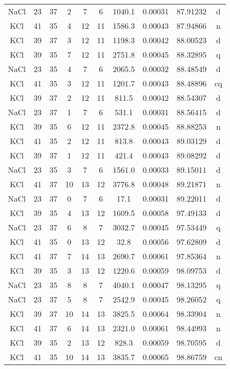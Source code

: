 \begin{table*}[htp]
\begin{tabular}{cccccccccc}
NaCl & 23 & 37 & 2 & 7 & 6 & 1040.1 & 0.00031 & 87.91232 & d \\
KCl & 41 & 35 & 4 & 12 & 11 & 1586.3 & 0.00043 & 87.94866 & n \\
KCl & 39 & 37 & 3 & 12 & 11 & 1198.3 & 0.00042 & 88.00523 & d \\
KCl & 39 & 35 & 7 & 12 & 11 & 2751.8 & 0.00045 & 88.32895 & q \\
NaCl & 23 & 35 & 4 & 7 & 6 & 2065.5 & 0.00032 & 88.48549 & d \\
KCl & 41 & 35 & 3 & 12 & 11 & 1201.7 & 0.00043 & 88.48896 & cq \\
KCl & 39 & 37 & 2 & 12 & 11 & 811.5 & 0.00042 & 88.54307 & d \\
NaCl & 23 & 37 & 1 & 7 & 6 & 531.1 & 0.00031 & 88.56415 & d \\
KCl & 39 & 35 & 6 & 12 & 11 & 2372.8 & 0.00045 & 88.88253 & n \\
KCl & 41 & 35 & 2 & 12 & 11 & 813.8 & 0.00043 & 89.03129 & d \\
KCl & 39 & 37 & 1 & 12 & 11 & 421.4 & 0.00043 & 89.08292 & d \\
NaCl & 23 & 35 & 3 & 7 & 6 & 1561.0 & 0.00033 & 89.15011 & d \\
KCl & 41 & 37 & 10 & 13 & 12 & 3776.8 & 0.00048 & 89.21871 & n \\
NaCl & 23 & 37 & 0 & 7 & 6 & 17.1 & 0.00031 & 89.22011 & d \\
KCl & 39 & 35 & 4 & 13 & 12 & 1609.5 & 0.00058 & 97.49133 & d \\
NaCl & 23 & 37 & 6 & 8 & 7 & 3032.7 & 0.00045 & 97.53449 & q \\
KCl & 41 & 35 & 0 & 13 & 12 & 32.8 & 0.00056 & 97.62809 & d \\
KCl & 41 & 37 & 7 & 14 & 13 & 2690.7 & 0.00061 & 97.85364 & n \\
KCl & 39 & 35 & 3 & 13 & 12 & 1220.6 & 0.00059 & 98.09753 & d \\
NaCl & 23 & 35 & 8 & 8 & 7 & 4040.1 & 0.00047 & 98.13295 & q \\
NaCl & 23 & 37 & 5 & 8 & 7 & 2542.9 & 0.00045 & 98.26052 & q \\
KCl & 39 & 37 & 10 & 14 & 13 & 3825.5 & 0.00064 & 98.33904 & n \\
KCl & 41 & 37 & 6 & 14 & 13 & 2321.0 & 0.00061 & 98.44993 & n \\
KCl & 39 & 35 & 2 & 13 & 12 & 828.3 & 0.00059 & 98.70595 & d \\
KCl & 41 & 35 & 10 & 14 & 13 & 3835.7 & 0.00065 & 98.86759 & cn \\

\end{tabular}
\end{table*}
